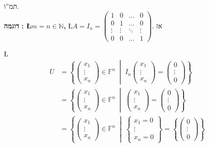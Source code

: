 \documentclass[english,hebrew]{article}
\begin{document}
תמ\textquotedblright ו.\\

\textbf{דוגמה }\textbf{{}\endL}\textbf{:\quad{} \L{$m=n\in\mathbb{N}$},\quad{}
}\L{$A=I_{n}=\begin{pmatrix}1 & 0 & \dots & 0\\
0 & 1 & \dots & 0\\
\vdots & \vdots & \ddots & \vdots\\
0 & 0 & \dots & 1
\end{pmatrix}$}. אז

\L{%
\begin{align*}
U & =\left\{ \begin{pmatrix}x_{1}\\
\vdots\\
x_{n}
\end{pmatrix}\in\mathbb{F}^{n}\;\middle|\;I_{n}\begin{pmatrix}x_{1}\\
\vdots\\
x_{n}
\end{pmatrix}=\begin{pmatrix}0\\
\vdots\\
0
\end{pmatrix}\right\} \\
 & =\left\{ \begin{pmatrix}x_{1}\\
\vdots\\
x_{n}
\end{pmatrix}\in\mathbb{F}^{n}\;\middle|\;\begin{pmatrix}x_{1}\\
\vdots\\
x_{n}
\end{pmatrix}=\begin{pmatrix}0\\
\vdots\\
0
\end{pmatrix}\right\} \\
 & =\left\{ \begin{pmatrix}x_{1}\\
\vdots\\
x_{n}
\end{pmatrix}\in\mathbb{F}^{n}\;\middle|\;\begin{cases}
x_{1}=0\\
\vdots\\
x_{n}=0
\end{cases}\right\} =\left\{ \begin{pmatrix}0\\
\vdots\\
0
\end{pmatrix}\right\} 
\end{align*}
}%
\end{document}
